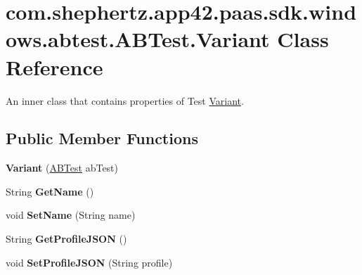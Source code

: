 \hypertarget{classcom_1_1shephertz_1_1app42_1_1paas_1_1sdk_1_1windows_1_1abtest_1_1_a_b_test_1_1_variant}{\section{com.\+shephertz.\+app42.\+paas.\+sdk.\+windows.\+abtest.\+A\+B\+Test.\+Variant Class Reference}
\label{classcom_1_1shephertz_1_1app42_1_1paas_1_1sdk_1_1windows_1_1abtest_1_1_a_b_test_1_1_variant}
}


An inner class that contains properties of Test \hyperlink{classcom_1_1shephertz_1_1app42_1_1paas_1_1sdk_1_1windows_1_1abtest_1_1_a_b_test_1_1_variant}{Variant}.  


\subsection*{Public Member Functions}
\begin{DoxyCompactItemize}
\item 
\hypertarget{classcom_1_1shephertz_1_1app42_1_1paas_1_1sdk_1_1windows_1_1abtest_1_1_a_b_test_1_1_variant_a2e7d59d0a7958e0f9809d342913ff00f}{{\bfseries Variant} (\hyperlink{classcom_1_1shephertz_1_1app42_1_1paas_1_1sdk_1_1windows_1_1abtest_1_1_a_b_test}{A\+B\+Test} ab\+Test)}\label{classcom_1_1shephertz_1_1app42_1_1paas_1_1sdk_1_1windows_1_1abtest_1_1_a_b_test_1_1_variant_a2e7d59d0a7958e0f9809d342913ff00f}

\item 
\hypertarget{classcom_1_1shephertz_1_1app42_1_1paas_1_1sdk_1_1windows_1_1abtest_1_1_a_b_test_1_1_variant_a0b6b7bee1307bc98ded5f2143c18abec}{String {\bfseries Get\+Name} ()}\label{classcom_1_1shephertz_1_1app42_1_1paas_1_1sdk_1_1windows_1_1abtest_1_1_a_b_test_1_1_variant_a0b6b7bee1307bc98ded5f2143c18abec}

\item 
\hypertarget{classcom_1_1shephertz_1_1app42_1_1paas_1_1sdk_1_1windows_1_1abtest_1_1_a_b_test_1_1_variant_aebd4fe584c36bacb718a844d71b3b887}{void {\bfseries Set\+Name} (String name)}\label{classcom_1_1shephertz_1_1app42_1_1paas_1_1sdk_1_1windows_1_1abtest_1_1_a_b_test_1_1_variant_aebd4fe584c36bacb718a844d71b3b887}

\item 
\hypertarget{classcom_1_1shephertz_1_1app42_1_1paas_1_1sdk_1_1windows_1_1abtest_1_1_a_b_test_1_1_variant_a671535871e41cd54e2ddb407708af8f6}{String {\bfseries Get\+Profile\+J\+S\+O\+N} ()}\label{classcom_1_1shephertz_1_1app42_1_1paas_1_1sdk_1_1windows_1_1abtest_1_1_a_b_test_1_1_variant_a671535871e41cd54e2ddb407708af8f6}

\item 
\hypertarget{classcom_1_1shephertz_1_1app42_1_1paas_1_1sdk_1_1windows_1_1abtest_1_1_a_b_test_1_1_variant_aed8a931dcc34ca85bfac0f347996f160}{void {\bfseries Set\+Profile\+J\+S\+O\+N} (String profile)}\label{classcom_1_1shephertz_1_1app42_1_1paas_1_1sdk_1_1windows_1_1abtest_1_1_a_b_test_1_1_variant_aed8a931dcc34ca85bfac0f347996f160}

\end{DoxyCompactItemize}
